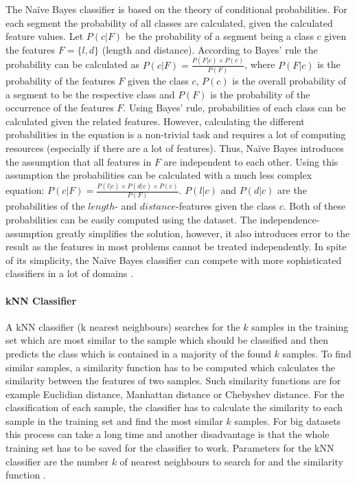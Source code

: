 The Naïve Bayes classifier is based on the theory of conditional probabilities. For each segment the probability of all classes are calculated, given the calculated feature values. Let $P(c|F)$ be the probability of a segment being a class $c$ given the features $F = \{l, d\}$ (length and distance). According to Bayes' rule the probability can be calculated as $P(c|F) = \frac{P(F|c) \times P(c)}{P(F)}$, where $P(F|c)$ is the probability of the features $F$ given the class $c$, $P(c)$ is the overall probability of a segment to be the respective class and $P(F)$ is the probability of the occurrence of the features $F$. Using Bayes' rule, probabilities of each class can be calculated given the related features. However, calculating the different probabilities in the equation is a non-trivial task and requires a lot of computing resources (especially if there are a lot of features). Thus, Naïve Bayes introduces the assumption that all features in $F$ are independent to each other. Using this assumption the probabilities can be calculated with a much less complex equation: $P(c|F) = \frac{P(l|c) \times P(d|c) \times P(c)}{P(F)}$. $P(l|c)$ and $P(d|c)$ are the probabilities of the $length$- and $distance$-features given the class $c$. Both of these probabilities can be easily computed using the dataset. The independence-assumption greatly simplifies the solution, however, it also introduces error to the result as the features in most problems cannot be treated independently. In spite of its simplicity, the Naïve Bayes classifier can compete with more sophisticated classifiers in a lot of domains
 \cite{Hall2016_DataMining_ML}. 



\paragraph{kNN Classifier}

A kNN classifier (k nearest neighbours) searches for the $k$ samples in the training set which are most similar to the sample which should be classified and then predicts the class which is contained in a majority of the found $k$ samples. To find similar samples, a similarity function has to be computed which calculates the similarity between the features of two samples. Such similarity functions are for example Euclidian distance, Manhattan distance or Chebyshev distance. For the classification of each sample, the classifier has to calculate the similarity to each sample in the training set and find the most similar $k$ samples. For big datasets this process can take a long time and another disadvantage is that the whole training set has to be saved for the classifier to work. Parameters for the kNN classifier are the number $k$ of nearest neighbours to search for and the similarity function \cite{Hall2016_DataMining_ML}.



